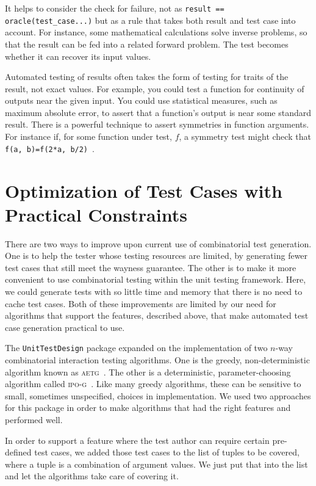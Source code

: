 \documentclass{juliacon}
\newcommand{\utd}{\texttt{UnitTestDesign}\xspace}
\begin{document}
\vskip 6pt
It helps to consider the check for failure, not as \verb|result == oracle(test_case...)| but as a rule that takes both result and test case into account. For instance, some mathematical calculations solve inverse problems, so that the result can be fed into a related forward problem. The test becomes whether it can recover its input values.

\vskip 6pt
Automated testing of results often takes the form of testing for traits of the result, not exact values. For example, you could test a function for continuity of outputs near the given input. You could use statistical measures, such as maximum absolute error, to assert that a function's output is near some standard result. There is a powerful technique to assert symmetries in function arguments. For instance if, for some function under test, $f$, a symmetry test might check that \verb|f(a, b)=f(2*a, b/2)|~\cite{Segura2016-qh}.


\section{Optimization of Test Cases with Practical Constraints}\label{sec:implementation}

There are two ways to improve upon current use of combinatorial test generation. One is to help the tester whose testing resources are limited, by generating fewer test cases that still meet the wayness guarantee. The other is to make it more convenient to use combinatorial testing within the unit testing framework. Here, we could generate tests with so little time and memory that there is no need to cache test cases. Both of these improvements are limited by our need for algorithms that support the features, described above, that make automated test case generation practical to use.

\vskip 6pt
The \utd package expanded on the implementation of two $n$-way combinatorial interaction testing algorithms. One is the greedy, non-deterministic algorithm known as \textsc{aetg}~\cite{Cohen1997-lb}. The other is a deterministic, parameter-choosing algorithm called \textsc{ipo-g}~\cite{Lei2008-xt}. Like many greedy algorithms, these can be sensitive to small, sometimes unspecified, choices in implementation. We used two approaches for this package in order to make algorithms that had the right features and performed well.

\vskip 6pt
In order to support a feature where the test author can require certain pre-defined test cases, we added those test cases to the list of tuples to be covered, where a tuple is a combination of argument values. We just put that into the list and let the algorithms take care of covering it.
\end{document}
